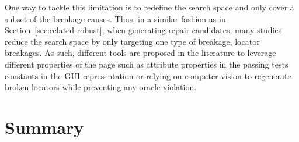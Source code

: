 One way to tackle this limitation is to redefine the search space and only cover a subset of the breakage causes. Thus, in a similar fashion as in Section~\ref{sec:related-robust}, when generating repair candidates, many studies reduce the search space by only targeting one type of breakage, locator breakages. As such, different tools are proposed in the literature to leverage different properties of the page such as attribute properties in the passing tests\cite{Choudhary2011} constants in the GUI representation\cite{Kirinuki2019} or relying on computer vision\cite{Stocco2018} to regenerate broken locators while preventing any oracle violation.





\section{Summary}
\label{sec:related-summary}